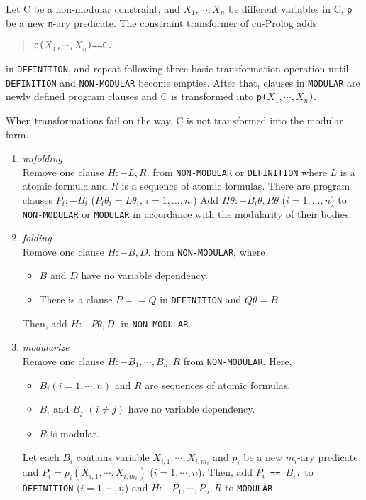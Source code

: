 Let C be a non-modular constraint, and 
{\tt $X_{1},\cdots,X_{n}$} be different variables in C, 
{\tt p} be a new {\tt n}-ary predicate.
The constraint transformer of cu-Prolog adds
\begin{quote}
{\tt p($X_{1}$,$\cdots$,$X_{n}$)==C.}
\end{quote}
in {\tt DEFINITION}, and repeat following three basic transformation
operation until 
{\tt DEFINITION} and {\tt NON-MODULAR} become empties.
After that, clauses in {\tt MODULAR} are newly defined program clauses
and C is transformed  into {\tt p($X_{1},\cdots,X_{n}$)}.

When transformations fail on the way, C is not transformed into
the modular form.
\begin{enumerate}
\item {\em unfolding}\\
Remove one clause $H:-L,R.$ from {\tt NON-MODULAR} or {\tt DEFINITION}
where $L$ is a atomic formula and $R$ is a sequence of atomic
formulas.  There are program clauses $P_{i}:-B_{i}$
($P_{i}\theta_{i}=L\theta_{i}$, $i=1,\ldots,n$.)  Add
$H\theta:-B_{i}\theta,R\theta$ ($i=1,\ldots,n$) to {\tt NON-MODULAR}
or {\tt MODULAR} in accordance with the modularity of their bodies.

\item {\em folding}\\
Remove one clause $H:-B,D.$ from {\tt NON-MODULAR}, where 
\begin{itemize}
\item $B$ and $D$ have no variable dependency. 
\item There is a clause $P==Q$ in {\tt DEFINITION} and $Q\theta=B$
\end{itemize}
Then, add $H:-P\theta,D.$ in {\tt NON-MODULAR}.

\item {\em modularize}\\
Remove one clause $H:-B_{1},\cdots,B_{n},R$ from {\tt NON-MODULAR}.
Here, 
\begin{itemize}
\item $B_{i} (i=1,\cdots,n)$ and $R$ are sequences of atomic formulas.
\item $B_{i}$ and $B_{j}$ $(i \neq j)$ have no variable dependency.
\item $R$ is modular.
\end{itemize}
Let each $B_{i}$ contains variable $X_{i,1},\cdots,X_{i,m_{i}}$
and $p_{i}$ be a new $m_{i}$-ary predicate and 
{\tt $P_{i}=p_{i}(X_{i,1},\cdots,X_{i,m_{i}})$} ($i=1,\cdots,n$).
Then, add 
{\tt $P_{i}$ == $B_{i}$.} to {\tt DEFINITION} ($i=1,\cdots,n$) 
and 
$H:-P_{1},\cdots,P_{n},R$ to {\tt MODULAR}.
\end{enumerate}

